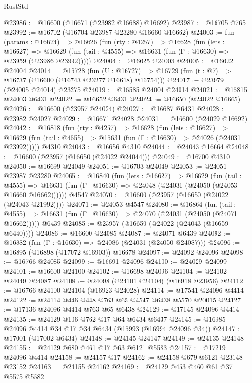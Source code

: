 \begin{lexlean}{RustStd}
\begin{coremodule}
@23986 := @16600 (@16671 (@23982 @16688) @16692)
@23987 := @16705 @765
@23992 := @16702 (@16704 @23987 @23280 @16660 @16662)
@24003 := fun (params : @16624) =>
  @16626
    (fun (rty : @4257) =>
    @16628
      (fun (lets : @16627) =>
      @16629 (fun (tail : @4555) => @16631 (fun (Γ : @16630) => @23959 (@23986 @23992)))))
@24004 := @16625 @24003
@24005 := @16622 @24004
@24014 := @16728
    (fun (U : @16727) => @16729 (fun (t : @7) => @16737 (@16600 (@16743 @23277 @16618) @16754)))
@24017 := @23979 (@24005 @24014) @23275
@24019 := @16585 @24004 @24014
@24021 := @16815 @24003 @6431
@24022 := @16652 @6431
@24024 := @16650 (@24022 @16665)
@24026 := @16600 (@23957 @24024)
@24027 := @16687 @6431
@24028 := @23982 @24027
@24029 := @16671 @24028
@24031 := @16600 (@24029 @16692)
@24042 := @16818
    (fun (rty : @4257) =>
    @16628
      (fun (lets : @16627) =>
      @16629 (fun (tail : @4555) => @16631 (fun (Γ : @16630) => @24026 (@24031 @23992)))))
    @4310
@24043 := @16656 @4310
@24044 := @24043 @16664
@24048 := @16600 (@23957 (@16650 (@24022 @24044)))
@24049 := @16700 @4310
@24050 := @16699 @24049
@24051 := @16703 @24049
@24053 := @24051 @23987 @23280
@24065 := @16840
    (fun (lets : @16627) =>
    @16629
      (fun (tail : @4555) =>
      @16631 (fun (Γ : @16630) => @24048 (@24031 (@24050 (@24053 @16660 @16662))))))
    @4547
@24070 := @16600 (@23957 (@16650 (@24022 (@24043 @21992))))
@24071 := @24053 @4547
@24080 := @16864
    (fun (tail : @4555) => @16631 (fun (Γ : @16630) => @24070 (@24031 (@24050 (@24071 @16662)))))
    @6439
@24085 := @23957 (@16650 (@24022 (@24043 (@16659 @6440))))
@24086 := @16600 @24085
@24087 := @24071 @6439
@24092 := @16882 (fun (Γ : @16630) => @24086 (@24031 (@24050 @24087)))
@24096 := @16895 (@16898 (@17072 @16903)) @16678
@24097 := @24092 @24096
@24098 := @16766 @24085
@24099 := @16691 @24096
@24100 := @24029 @24099
@24101 := @16600 @24100
@24102 := @16698 @24096
@24104 := @24102 @24049 @24087
@24108 := @24098 (@24101 @24104) (@16918 @23956)
@24112 := @16766 @24100 @24104 (@16923 @24028)
@24114 := @17541 @24096 @4414
@24122 := @24114 @446 @448 @763 @65 @4547 @6438 @5570 @20015
@24127 := @17136 @24096 @4414 @763 @65 @6438
@24129 := @17145 @24096 @4414
@24135 := @24129 @106 @762 @17 @64 @6434 @6437
@24145 := @16985 @24096 @4414 @34 @17 @34 @6434 (@16993 (@16994 @24096 @34))
@24147 := @17001 (@17002 @6434)
@24148 := @24145 @24147
@24149 := @24135 @24148
@24155 := @24129 @680 @461 @17 @63 @6121 @5583
@24157 := @17219 @24096 @4414
@24158 := @24157 @17
@24162 := @24158 @679 @6121 @23148 @23152
@24163 := @24155 @24162
@24169 := @24129 @453 @460 @61 @37 @5575 @5582

\end{coremodule}
\end{lexlean}
